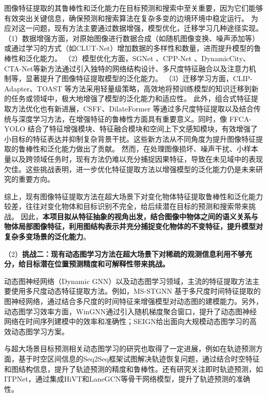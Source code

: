 图像特征提取的其鲁棒性和泛化能力在目标预测和搜索中至关重要，因为它们能够有效突出关键信息，确保预测和搜索算法在复杂多变的边境环境中稳定运行。
为应对这一问题，现有方法主要通过数据增强，模型优化，迁移学习几种途径实现。
（1）数据增强方面，对原始图像进行数据合成（如随机图像变换\cite{cubuk2020randaugment}、噪声添加\cite{chowdhury2025r}等）或通过学习的方式（如CLUT-Net\cite{mei2022clut}）增加数据的多样性和数量，进而提升模型的鲁棒性和泛化能力。
（2）模型优化方面，SGNet \cite{liu2021sg}、CPP-Net \cite{guo2024cpp} 、DynamicCity\cite{dynamiccity2025}、CTA-Net\cite{Meng2024CTA-Net}等新方法通过引入独特的网络结构设计、多尺度特征融合以及注意力机制等，显著提升了图像特征提取模型的泛化能力。
（3）迁移学习方面，CLIP-Adapter\cite{gao2021clip}、TOAST\cite{shi2023toast} 等方法采用轻量级策略，高效地将预训练模型的知识迁移到新的任务或领域中，极大地增强了模型的泛化能力和适应性。
此外，组合式特征提取方法优化也有新进展，CSFF\cite{cheng2020cross}、DilateFormer\cite{jiao2023dilateformer} 等通过多尺度特征提取以及结合传统与深度学习方法，在增强特征的鲁棒性方面具有重要意义。同时，像 FFCA-YOLO \cite{yin2024ffca} 结合了特征增强模块、特征融合模块和空间上下文感知模块，有效增强了小目标的特征表达并抑制复杂背景干扰。这些新方法从不同角度为提升图像特征提取的鲁棒性和泛化能力做出了贡献。
然而，在处理图像损坏、噪声干扰、小样本量以及跨领域任务时，现有方法仍难以充分捕捉因果特征，导致在未见域中的表现欠佳。这些挑战表明，进一步优化特征提取方法以增强模型的泛化能力仍是未来研究的重要方向。

综上，现有图像特征提取方法在超大场景下对变化物体特征提取鲁棒性和泛化能力较差，往往对变化物体和目标识别不完全，给后续潜在目标的预测和搜索带来挑战。
因此，\textbf{本项目拟从特征抽象的视角出发，结合图像中物体之间的语义关系与物体局部图像特征，利用图结构表示并充分捕捉变化物体的不变特征，提升模型对复杂多变场景的泛化能力}。

（2）\textbf{挑战二：现有动态图学习方法在超大场景下对稀疏的观测信息利用不够充分，给目标潜在位置预测精度和可解释性带来挑战。}

动态图神经网络（Dynamic GNN）以及动态图学习领域，主流的特征提取方法主要使用多尺度动态特征提取方法。例如，MS-STGNN \cite{wang2023multi}基于多尺度时间特征提取的图神经网络，通过结合多尺度的时间特征来增强模型对动态图的建模能力。另外，动态图学习效率方面，WinGNN\cite{zhu2023wingnn}通过引入随机梯度聚合窗口，提升了动态图神经网络在时间序列建模中的效率和准确性；SEIGN给出面向大规模动态图学习的高效动态图学习方案。

与超大场景目标预测相关动态图学习的研究也取得了一定进展，例如在轨迹预测方面，基于时空区间信息的Seq2Seq\cite{Seq2SeqTrajRec}框架试图解决轨迹恢复问题，通过结合时空特征和图结构信息，提升了轨迹预测的精度和鲁棒性。还有研究关注即时轨迹预测，如ITPNet\cite{ITPNet}，通过集成HiVT\cite{zhou2022hivt}和LaneGCN\cite{liang2020learning}等骨干网络模型，提升了轨迹预测的准确性。

